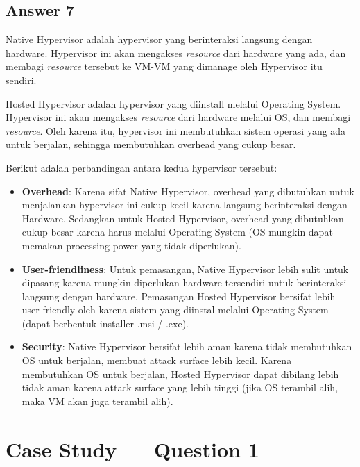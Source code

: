 \documentclass[
	11pt, %
	indonesian
]{assignment}
\begin{document}
\subsection*{Answer 7}

Native Hypervisor adalah hypervisor yang berinteraksi langsung dengan hardware. Hypervisor ini akan mengakses \textit{resource} dari hardware yang ada, dan membagi \textit{resource} tersebut ke VM-VM yang dimanage oleh Hypervisor itu sendiri.

Hosted Hypervisor adalah hypervisor yang diinstall melalui Operating System. Hypervisor ini akan mengakses \textit{resource} dari hardware melalui OS, dan membagi \textit{resource}. Oleh karena itu, hypervisor ini membutuhkan sistem operasi yang ada untuk berjalan, sehingga membutuhkan overhead yang cukup besar.

Berikut adalah perbandingan antara kedua hypervisor tersebut:
\begin{itemize}
	\item \textbf{Overhead}: Karena sifat Native Hypervisor, overhead yang dibutuhkan untuk menjalankan hypervisor ini cukup kecil karena langsung berinteraksi dengan Hardware\@. Sedangkan untuk Hosted Hypervisor, overhead yang dibutuhkan cukup besar karena harus melalui Operating System (OS mungkin dapat memakan processing power yang tidak diperlukan).
	\item \textbf{User-friendliness}: Untuk pemasangan, Native Hypervisor lebih sulit untuk dipasang karena mungkin diperlukan hardware tersendiri untuk berinteraksi langsung dengan hardware. Pemasangan Hosted Hypervisor bersifat lebih user-friendly oleh karena sistem yang diinstal melalui Operating System (dapat berbentuk installer .msi / .exe)\@.
	\item \textbf{Security}: Native Hypervisor bersifat lebih aman karena tidak membutuhkan OS untuk berjalan, membuat attack surface lebih kecil. Karena membutuhkan OS untuk berjalan, Hosted Hypervisor dapat dibilang lebih tidak aman karena attack surface yang lebih tinggi (jika OS terambil alih, maka VM akan juga terambil alih).
\end{itemize}

\section*{Case Study --- Question 1}
\end{document}
